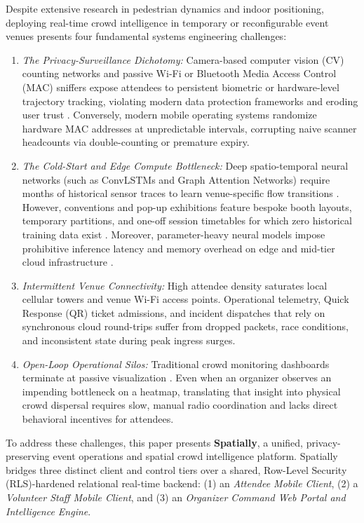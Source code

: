 \documentclass[conference,a4paper]{IEEEtran}
\begin{document}
Despite extensive research in pedestrian dynamics and indoor positioning, deploying real-time crowd intelligence in temporary or reconfigurable event venues presents four fundamental systems engineering challenges:
\begin{enumerate}
    \item \emph{The Privacy-Surveillance Dichotomy:} Camera-based computer vision (CV) counting networks and passive Wi-Fi or Bluetooth Media Access Control (MAC) sniffers expose attendees to persistent biometric or hardware-level trajectory tracking, violating modern data protection frameworks and eroding user trust \cite{martin2025, faragher2015}. Conversely, modern mobile operating systems randomize hardware MAC addresses at unpredictable intervals, corrupting naive scanner headcounts via double-counting or premature expiry.
    \item \emph{The Cold-Start and Edge Compute Bottleneck:} Deep spatio-temporal neural networks (such as ConvLSTMs and Graph Attention Networks) require months of historical sensor traces to learn venue-specific flow transitions \cite{dang2024, duan2026}. However, conventions and pop-up exhibitions feature bespoke booth layouts, temporary partitions, and one-off session timetables for which zero historical training data exist \cite{daamen2026}. Moreover, parameter-heavy neural models impose prohibitive inference latency and memory overhead on edge and mid-tier cloud infrastructure \cite{shang2026}.
    \item \emph{Intermittent Venue Connectivity:} High attendee density saturates local cellular towers and venue Wi-Fi access points. Operational telemetry, Quick Response (QR) ticket admissions, and incident dispatches that rely on synchronous cloud round-trips suffer from dropped packets, race conditions, and inconsistent state during peak ingress surges.
    \item \emph{Open-Loop Operational Silos:} Traditional crowd monitoring dashboards terminate at passive visualization \cite{yasufuku2024}. Even when an organizer observes an impending bottleneck on a heatmap, translating that insight into physical crowd dispersal requires slow, manual radio coordination and lacks direct behavioral incentives for attendees.
\end{enumerate}

To address these challenges, this paper presents \textbf{Spatially}, a unified, privacy-preserving event operations and spatial crowd intelligence platform. Spatially bridges three distinct client and control tiers over a shared, Row-Level Security (RLS)-hardened relational real-time backend: (1) an \emph{Attendee Mobile Client}, (2) a \emph{Volunteer Staff Mobile Client}, and (3) an \emph{Organizer Command Web Portal and Intelligence Engine}.
\end{document}

